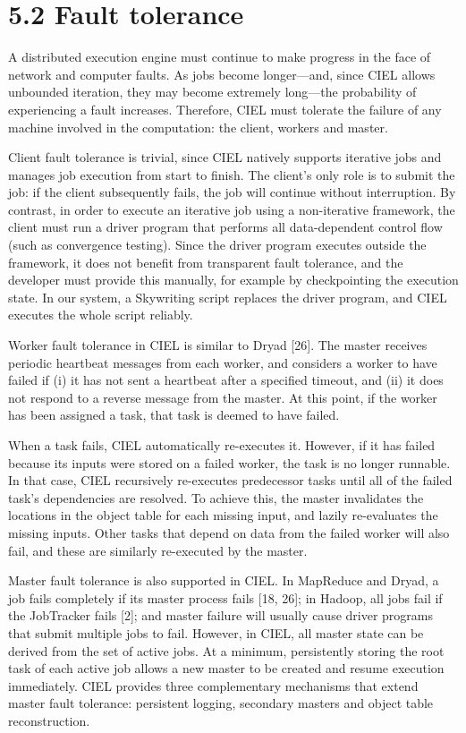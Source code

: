 \documentclass[
]{article}
\begin{document}
\section{5.2 Fault tolerance}\label{fault-tolerance}

A distributed execution engine must continue to make progress in the
face of network and computer faults. As jobs become longer---and, since
CIEL allows unbounded iteration, they may become extremely long---the
probability of experiencing a fault increases. Therefore, CIEL must
tolerate the failure of any machine involved in the computation: the
client, workers and master.

Client fault tolerance is trivial, since CIEL natively supports
iterative jobs and manages job execution from start to finish. The
client's only role is to submit the job: if the client subsequently
fails, the job will continue without interruption. By contrast, in order
to execute an iterative job using a non-iterative framework, the client
must run a driver program that performs all data-dependent control flow
(such as convergence testing). Since the driver program executes outside
the framework, it does not benefit from transparent fault tolerance, and
the developer must provide this manually, for example by checkpointing
the execution state. In our system, a Skywriting script replaces the
driver program, and CIEL executes the whole script reliably.

Worker fault tolerance in CIEL is similar to Dryad {[}26{]}. The master
receives periodic heartbeat messages from each worker, and considers a
worker to have failed if (i) it has not sent a heartbeat after a
specified timeout, and (ii) it does not respond to a reverse message
from the master. At this point, if the worker has been assigned a task,
that task is deemed to have failed.

When a task fails, CIEL automatically re-executes it. However, if it has
failed because its inputs were stored on a failed worker, the task is no
longer runnable. In that case, CIEL recursively re-executes predecessor
tasks until all of the failed task's dependencies are resolved. To
achieve this, the master invalidates the locations in the object table
for each missing input, and lazily re-evaluates the missing inputs.
Other tasks that depend on data from the failed worker will also fail,
and these are similarly re-executed by the master.

Master fault tolerance is also supported in CIEL. In MapReduce and
Dryad, a job fails completely if its master process fails {[}18, 26{]};
in Hadoop, all jobs fail if the JobTracker fails {[}2{]}; and master
failure will usually cause driver programs that submit multiple jobs to
fail. However, in CIEL, all master state can be derived from the set of
active jobs. At a minimum, persistently storing the root task of each
active job allows a new master to be created and resume execution
immediately. CIEL provides three complementary mechanisms that extend
master fault tolerance: persistent logging, secondary masters and object
table reconstruction.
\end{document}
